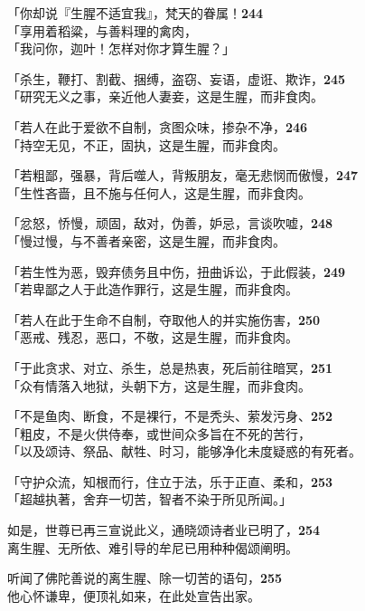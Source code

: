 「你却说『生腥不适宜我』，梵天的眷属！\hfill{\grayfootnotesize \textbf{244}} \\
「享用着稻粱，与善料理的禽肉，\\
「我问你，迦叶！怎样对你才算生腥？」


「杀生，鞭打、割截、捆缚，盗窃、妄语，虚诳、欺诈，\hfill{\grayfootnotesize \textbf{245}} \\
「研究无义之事，亲近他人妻妾，这是生腥，而非食肉。


「若人在此于爱欲不自制，贪图众味，掺杂不净，\hfill{\grayfootnotesize \textbf{246}} \\
「持空无见，不正，固执，这是生腥，而非食肉。


「若粗鄙，强暴，背后噬人，背叛朋友，毫无悲悯而傲慢，\hfill{\grayfootnotesize \textbf{247}} \\
「生性吝啬，且不施与任何人，这是生腥，而非食肉。


「忿怒，㤭慢，顽固，敌对，伪善，妒忌，言谈吹嘘，\hfill{\grayfootnotesize \textbf{248}} \\
「慢过慢，与不善者亲密，这是生腥，而非食肉。


「若生性为恶，毁弃债务且中伤，扭曲诉讼，于此假装，\hfill{\grayfootnotesize \textbf{249}} \\
「若卑鄙之人于此造作罪行，这是生腥，而非食肉。


「若人在此于生命不自制，夺取他人的并实施伤害，\hfill{\grayfootnotesize \textbf{250}} \\
「恶戒、残忍，恶口，不敬，这是生腥，而非食肉。


「于此贪求、对立、杀生，总是热衷，死后前往暗冥，\hfill{\grayfootnotesize \textbf{251}} \\
「众有情落入地狱，头朝下方，这是生腥，而非食肉。


「不是鱼肉、断食，不是裸行，不是秃头、萦发污身、\hfill{\grayfootnotesize \textbf{252}} \\
「粗皮，不是火供侍奉，或世间众多旨在不死的苦行，\\
「以及颂诗、祭品、献牲、时习，能够净化未度疑惑的有死者。


「守护众流，知根而行，住立于法，乐于正直、柔和，\hfill{\grayfootnotesize \textbf{253}} \\
「超越执著，舍弃一切苦，智者不染于所见所闻。」


如是，世尊已再三宣说此义，通晓颂诗者业已明了，\hfill{\grayfootnotesize \textbf{254}} \\
离生腥、无所依、难引导的牟尼已用种种偈颂阐明。


听闻了佛陀善说的离生腥、除一切苦的语句，\hfill{\grayfootnotesize \textbf{255}} \\
他心怀谦卑，便顶礼如来，在此处宣告出家。


